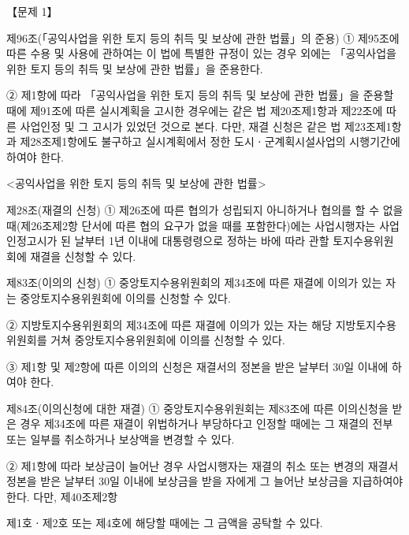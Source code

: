 \begin{longquestion}{【문제 1】}
\begin{framedtext}
제96조(「공익사업을 위한 토지 등의 취득 및 보상에 관한 법률」의 준용) ① 제95조에 따른 수용 및 사용에 관하여는 이 법에 특별한 규정이 있는 경우 외에는 「공익사업을 위한 토지 등의 취득 및 보상에 관한 법률」을 준용한다. \par
② 제1항에 따라 「공익사업을 위한 토지 등의 취득 및 보상에 관한 법률」을 준용할 때에 제91조에 따른 실시계획을 고시한 경우에는 같은 법 제20조제1항과 제22조에 따른 사업인정 및 그 고시가 있었던 것으로 본다. 다만, 재결 신청은 같은 법 제23조제1항과 제28조제1항에도 불구하고 실시계획에서 정한 도시ㆍ군계획시설사업의 시행기간에 하여야 한다. \par
<공익사업을 위한 토지 등의 취득 및 보상에 관한 법률> \par
제28조(재결의 신청) ① 제26조에 따른 협의가 성립되지 아니하거나 협의를 할 수 없을 때(제26조제2항 단서에 따른 협의 요구가 없을 때를 포함한다)에는 사업시행자는 사업인정고시가 된 날부터 1년 이내에 대통령령으로 정하는 바에 따라 관할 토지수용위원회에 재결을 신청할 수 있다. \par
제83조(이의의 신청) ① 중앙토지수용위원회의 제34조에 따른 재결에 이의가 있는 자는 중앙토지수용위원회에 이의를 신청할 수 있다. \par
② 지방토지수용위원회의 제34조에 따른 재결에 이의가 있는 자는 해당 지방토지수용위원회를 거쳐 중앙토지수용위원회에 이의를 신청할 수 있다. \par
③ 제1항 및 제2항에 따른 이의의 신청은 재결서의 정본을 받은 날부터 30일 이내에 하여야 한다. \par
제84조(이의신청에 대한 재결) ① 중앙토지수용위원회는 제83조에 따른 이의신청을 받은 경우 제34조에 따른 재결이 위법하거나 부당하다고 인정할 때에는 그 재결의 전부 또는 일부를 취소하거나 보상액을 변경할 수 있다. \par
② 제1항에 따라 보상금이 늘어난 경우 사업시행자는 재결의 취소 또는 변경의 재결서 정본을 받은 날부터 30일 이내에 보상금을 받을 자에게 그 늘어난 보상금을 지급하여야 한다. 다만, 제40조제2항 \par
제1호ㆍ제2호 또는 제4호에 해당할 때에는 그 금액을 공탁할 수 있다. \par
\end{framedtext}
\end{longquestion}
